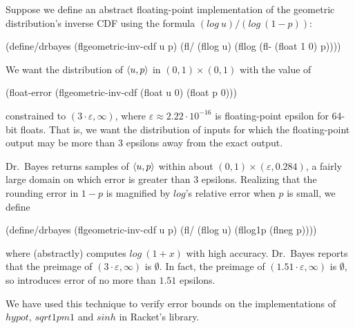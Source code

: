 \documentclass{llncs}
\begin{document}
Suppose we define an abstract floating-point implementation of the geometric distribution's inverse CDF using the formula $(log~u){/}(log~(1-p))$:
\vspace{-0.5\baselineskip}
\begin{center}
\begin{schemedisplay}
(define/drbayes (flgeometric-inv-cdf u p)
  (fl/ (fllog u) (fllog (fl- (float 1 0) p))))
\end{schemedisplay}
\end{center}
We want the distribution of $\langle{u,p}\rangle$ in $(0,1) \times (0,1)$ with the value of
\vspace{-0.5\baselineskip}
\begin{center}
\begin{schemedisplay}
(float-error (flgeometric-inv-cdf (float u 0) (float p 0)))
\end{schemedisplay}
\end{center}
constrained to $(3 \cdot \varepsilon,\infty)$, where $\varepsilon \approx 2.22\cdot 10^{-16}$ is floating-point epsilon for 64-bit floats.
That is, we want the distribution of inputs for which the floating-point output may be more than $3$ epsilons away from the exact output.

Dr.~Bayes returns samples of $\langle{u,p}\rangle$ within about $(0,1) \times (\varepsilon,0.284)$, a fairly large domain on which error is greater than $3$ epsilons.
Realizing that the rounding error in $1-p$ is magnified by $log$'s relative error when $p$ is small, we define
\vspace{-0.5\baselineskip}
\begin{center}
\begin{schemedisplay}
(define/drbayes (flgeometric-inv-cdf u p)
  (fl/ (fllog u) (fllog1p (flneg p))))
\end{schemedisplay}
\end{center}
where  (abstractly) computes $log~(1+x)$ with high accuracy.
Dr.~Bayes reports that the preimage of $(3 \cdot \varepsilon,\infty)$ is $\emptyset$.
In fact, the preimage of $(1.51 \cdot \varepsilon,\infty)$ is $\emptyset$, so  introduces error of no more than $1.51$ epsilons.

We have used this technique to verify error bounds on the implementations of $hypot$, $sqrt1pm1$ and $sinh$ in Racket's  library.


\end{document}
